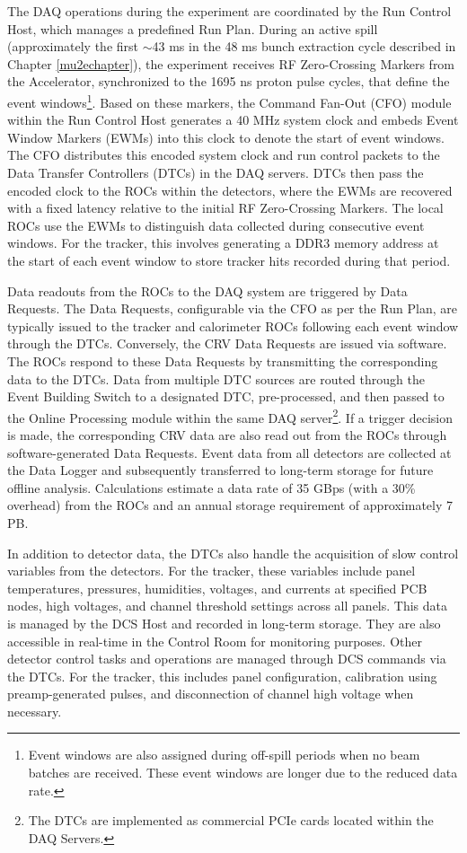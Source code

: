 The DAQ operations during the experiment are coordinated by the Run Control Host, 
which manages a predefined Run Plan. During an active spill (approximately the first 
$\sim$43 ms in the 48 ms bunch extraction cycle described in Chapter \ref{mu2echapter}), 
the experiment receives RF Zero-Crossing Markers from the Accelerator, 
synchronized to the 1695 ns proton pulse cycles, that define the event 
windows\footnote{Event windows are also assigned during off-spill periods when no beam batches are received. 
These event windows are longer due to the reduced data rate.}. Based on these markers, the Command Fan-Out 
(CFO) module within the Run Control Host generates a 40 MHz system clock and embeds Event Window Markers 
(EWMs) into this clock to denote the start of event windows. 
The CFO distributes this encoded system clock and run control packets to the 
Data Transfer Controllers (DTCs) in the DAQ servers. DTCs then pass the encoded clock to 
the ROCs within the detectors, where the EWMs are recovered with a fixed latency relative to the 
initial RF Zero-Crossing Markers. The local ROCs use the EWMs to distinguish data 
collected during consecutive event windows. For the tracker, 
this involves generating a DDR3 memory address at the start of each event 
window to store tracker hits recorded during that period.

Data readouts from the ROCs to the DAQ system are triggered by Data Requests. 
The Data Requests, configurable via the CFO as per the Run Plan, are typically 
issued to the tracker and calorimeter ROCs following each event window through 
the DTCs. Conversely, the CRV Data Requests are issued via software. The ROCs 
respond to these Data Requests by transmitting the corresponding data to the DTCs. 
Data from multiple DTC sources are routed through the Event Building Switch to 
a designated DTC, pre-processed, and then passed to the Online Processing module 
within the same DAQ server\footnote{The DTCs are implemented as commercial PCIe cards located 
within the DAQ Servers.}. If a trigger decision is made, the corresponding CRV data are also 
read out from the ROCs through software-generated Data Requests. Event data from all detectors 
are collected at the Data Logger and subsequently transferred to long-term storage for 
future offline analysis. Calculations estimate a data rate of 35 GBps (with a 30\% 
overhead) from the ROCs and an annual storage requirement of approximately 7 PB.

In addition to detector data, the DTCs also handle the acquisition of 
slow control variables from the detectors. For the tracker, these 
variables include panel temperatures, pressures, humidities, voltages, 
and currents at specified PCB nodes, high voltages, and channel threshold 
settings across all panels. This data is managed by the DCS Host and recorded 
in long-term storage. They are also accessible in real-time in the 
Control Room for monitoring purposes. Other detector control tasks 
and operations are managed through DCS commands via the DTCs. 
For the tracker, this includes panel configuration, 
calibration using preamp-generated pulses, and disconnection of channel high voltage when necessary.

